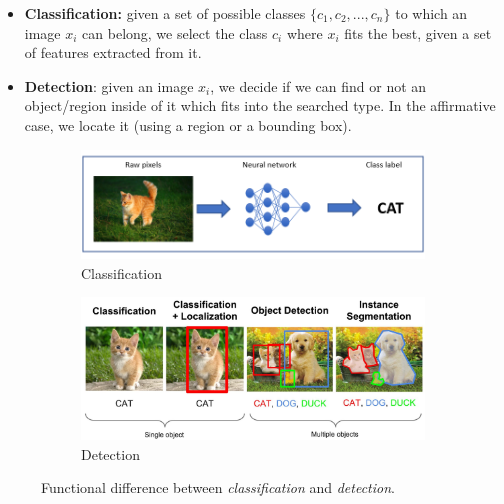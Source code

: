 \begin{itemize}
	\item \textbf{Classification:} given a set of possible classes $\{c_1, c_2, ..., c_n\}$ to which an image $x_i$ can belong, we select the class $c_i$ where $x_i$ fits the best, given a set of features extracted from it.
	\item \textbf{Detection}: given an image $x_i$, we decide if we can find or not an object/region inside of it which fits into the searched type. In the affirmative case, we locate it (using a region or a bounding box).
\end{itemize}

\begin{figure}[h!]
	\centering
	\begin{subfigure}[h!]{0.7\textwidth}
		\includegraphics[width=\textwidth]{images/classification}
		\caption{Classification}
		\label{fig:1_classification}
	\end{subfigure}
	
	\qquad
	
	\begin{subfigure}[h!]{0.7\textwidth}
		\includegraphics[width=\textwidth]{images/detection}
		\caption{Detection}
		\label{fig:1_detection}			
	\end{subfigure}
	
	\caption{Functional difference between \textit{classification} and \textit{detection}.}
	\label{fig:1_class_vs_det}
\end{figure}


